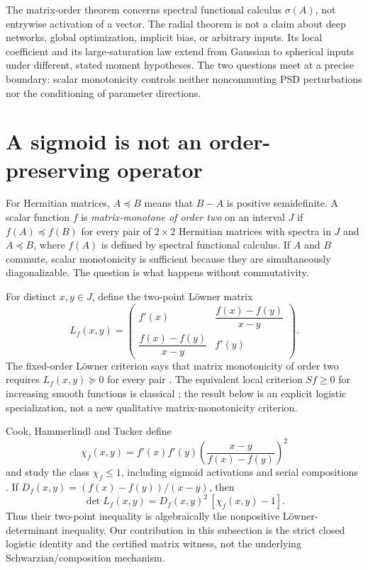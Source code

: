 \documentclass[11pt]{article}
\begin{document}
The matrix-order theorem concerns spectral functional calculus $\sigma(A)$, not entrywise activation of a vector.
The radial theorem is not a claim about deep networks, global optimization, implicit bias, or arbitrary inputs.  Its
local coefficient and its large-saturation law extend from Gaussian to spherical inputs under different, stated
moment hypotheses.  The
two questions meet at a precise boundary: scalar monotonicity controls neither noncommuting PSD perturbations nor
the conditioning of parameter directions.

\section{A sigmoid is not an order-preserving operator}

For Hermitian matrices, $A\preceq B$ means that $B-A$ is positive semidefinite.  A scalar function $f$ is
\emph{matrix-monotone of order two} on an interval $J$ if $f(A)\preceq f(B)$ for every pair of $2\times2$
Hermitian matrices with spectra in $J$ and $A\preceq B$, where $f(A)$ is defined by spectral functional calculus.
If $A$ and $B$ commute, scalar monotonicity is sufficient because they are simultaneously diagonalizable.  The
question is what happens without commutativity.

For distinct $x,y\in J$, define the two-point L\"owner matrix
\begin{equation}
 L_f(x,y)=
 \begin{pmatrix}
  f'(x)&\dfrac{f(x)-f(y)}{x-y}\\[5pt]
  \dfrac{f(x)-f(y)}{x-y}&f'(y)
 \end{pmatrix}.
 \label{eq:loewnermatrix}
\end{equation}
The fixed-order L\"owner criterion says that matrix monotonicity of order two requires
$L_f(x,y)\succeq0$ for every pair \cite{hiai2010,heinavaara2019}.  The equivalent local criterion
$Sf\ge0$ for increasing smooth functions is classical \cite[Lemma 10]{kozlovski2008}; the result below is an
explicit logistic specialization, not a new qualitative matrix-monotonicity criterion.

Cook, Hammerlindl and Tucker define
\[
 \chi_f(x,y)=f'(x)f'(y)
 \left(\frac{x-y}{f(x)-f(y)}\right)^2
\]
and study the class $\chi_f\le1$, including sigmoid activations and serial compositions \cite{cook2023}.  If
$D_f(x,y)=(f(x)-f(y))/(x-y)$, then
\begin{equation}
 \det L_f(x,y)=D_f(x,y)^2\,[\chi_f(x,y)-1].
 \label{eq:coexpanding}
\end{equation}
Thus their two-point inequality is algebraically the nonpositive L\"owner-determinant inequality.  Our contribution
in this subsection is the strict closed logistic identity and the certified matrix witness, not the underlying
Schwarzian/composition mechanism.
\end{document}
